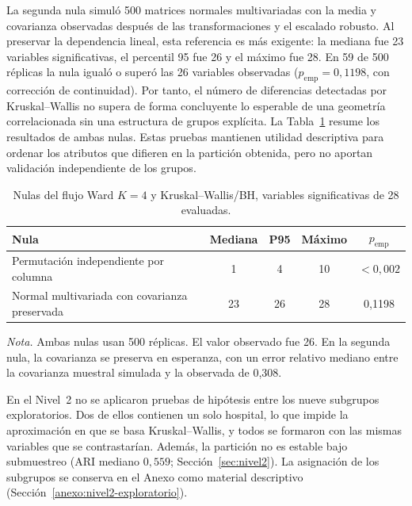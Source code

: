 La segunda nula simuló 500 matrices normales multivariadas con la media y
covarianza observadas después de las transformaciones y el escalado robusto. Al
preservar la dependencia lineal, esta referencia es más exigente: la mediana
fue 23 variables significativas, el percentil 95 fue 26 y el máximo fue 28. En
59 de 500 réplicas la nula igualó o superó las 26 variables observadas
($p_{\mathrm{emp}}=0{,}1198$, con corrección de continuidad). Por tanto, el
número de diferencias detectadas por Kruskal--Wallis no supera de forma
concluyente lo esperable de una geometría correlacionada sin una estructura de
grupos explícita. La Tabla~\ref{tab:nulas-circularidad} resume los resultados de
ambas nulas. Estas pruebas mantienen utilidad descriptiva para ordenar los
atributos que difieren en la partición obtenida, pero no aportan validación
independiente de los grupos.

\begin{table}[htbp]
\centering
\caption{Nulas del flujo Ward $K=4$ y Kruskal--Wallis/BH, variables significativas de 28 evaluadas.}
\label{tab:nulas-circularidad}
\begin{tabular}{l c c c c}
\toprule
\textbf{Nula} & \textbf{Mediana} & \textbf{P95} & \textbf{Máximo} & \textbf{$p_{\mathrm{emp}}$} \\
\midrule
Permutación independiente por columna & 1 & 4 & 10 & $<0{,}002$ \\
Normal multivariada con covarianza preservada & 23 & 26 & 28 & 0,1198 \\
\bottomrule
\end{tabular}
\par\smallskip
\begin{minipage}{\textwidth}
\normalsize\raggedright
\textit{Nota.} Ambas nulas usan 500 réplicas. El valor observado fue 26. En la
segunda nula, la covarianza se preserva en esperanza, con un error relativo mediano
entre la covarianza muestral simulada y la observada de 0,308.
\end{minipage}
\end{table}

En el Nivel~2 no se aplicaron pruebas de hipótesis entre los nueve subgrupos exploratorios. Dos de ellos contienen un solo hospital, lo que impide la aproximación en que se basa Kruskal--Wallis, y todos se formaron con las mismas variables que se contrastarían. Además, la partición no es estable bajo submuestreo (ARI mediano $0{,}559$; Sección~\ref{sec:nivel2}). La asignación de los subgrupos se conserva en el Anexo como material descriptivo (Sección~\ref{anexo:nivel2-exploratorio}).

